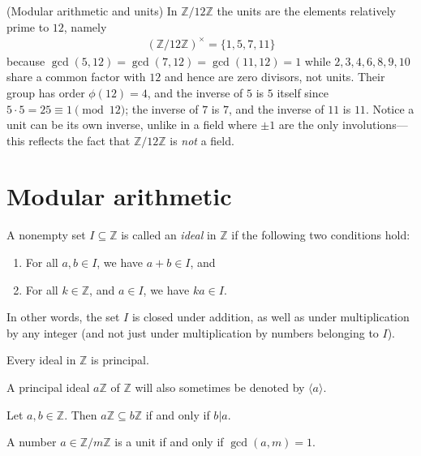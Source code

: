 \documentclass[a4paper, 12pt]{book} %
\begin{document}
\begin{example}
    (Modular arithmetic and units) In $\mathbb{Z}/12\mathbb{Z}$ the units are the elements relatively prime to $12$, namely
    \begin{align}
        (\mathbb{Z}/12\mathbb{Z})^\times = \{1, 5, 7, 11\}
    \end{align}
    because $\gcd(5,12)=\gcd(7,12)=\gcd(11,12)=1$ while $2,3,4,6,8,9,10$ share a common factor with $12$ and hence are zero divisors, not units. Their group has order $\phi(12) = 4$, and the inverse of $5$ is $5$ itself since $5\cdot 5 = 25 \equiv 1 \pmod{12}$; the inverse of $7$ is $7$, and the inverse of $11$ is $11$. Notice a unit can be its own inverse, unlike in a field where $\pm 1$ are the only involutions---this reflects the fact that $\mathbb{Z}/12\mathbb{Z}$ is \emph{not} a field.
\end{example}

\section{Modular arithmetic}

A nonempty set $I \subseteq \mathbb{Z}$ is called an \emph{ideal} in $\mathbb{Z}$ if the following two conditions hold:
\begin{enumerate}
    \item For all $a, b \in I$, we have $a + b \in I$, and
    \item For all $k \in \mathbb{Z}$, and $a \in I$, we have $ka \in I$.
\end{enumerate}
In other words, the set $I$ is closed under addition, as well as under multiplication by any integer (and not just under multiplication by numbers belonging to $I$).

\begin{proposition}
    Every ideal in $\mathbb{Z}$ is principal.
\end{proposition}

A principal ideal $a\mathbb{Z}$ of $\mathbb{Z}$ will also sometimes be denoted by $\langle a\rangle$.

\begin{proposition}
    Let $a, b \in \mathbb{Z}$. Then $a \mathbb{Z} \subseteq b \mathbb{Z}$ if and only if $b|a$.
\end{proposition}


\begin{proposition}
    A number $a \in \mathbb{Z}/m\mathbb{Z}$ is a unit if and only if $\gcd(a,m)= 1$.
\end{proposition}
\end{document}
